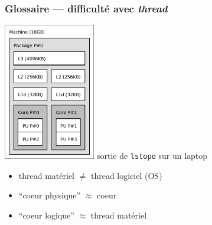 \documentclass[xcolor={x11names,svgnames}]{beamer}
\begin{document}

\begin{frame}
  \frametitle{Glossaire --- difficulté avec \og \emph{thread}\fg}

  \begin{center}
    \includegraphics[height=6cm]{lstopo_laptop.pdf}%
    \quad \small sortie de \texttt{lstopo} sur un laptop
  \end{center}

  \begin{itemize}
  \item thread matériel $\neq$ thread logiciel (OS)
  \item ``coeur physique'' $\approx$ coeur
  \item ``coeur logique''  $\approx$ thread matériel
  \end{itemize}
  
\end{frame}

\end{document}
